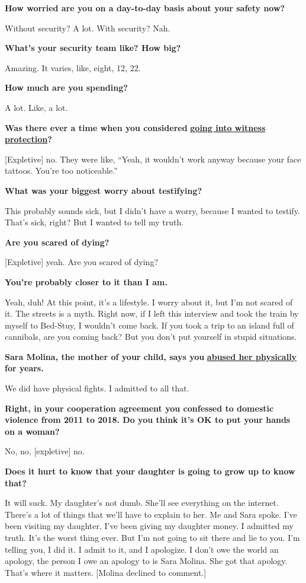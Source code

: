 \textbf{How worried are you on a day-to-day basis about your safety
now?}

Without security? A lot. With security? Nah.

\textbf{What's your security team like? How big?}

Amazing. It varies, like, eight, 12, 22.

\textbf{How much are you spending?}

A lot. Like, a lot.

\textbf{Was there ever a time when you considered}
\textbf{\href{https://www.nytimes3xbfgragh.onion/2019/09/22/nyregion/tekashi-69-trial-testimony.html}{going
into witness protection}?}

{[}Expletive{]} no. They were like, ``Yeah, it wouldn't work anyway
because your face tattoos. You're too noticeable.''

\textbf{What was your biggest worry about testifying?}

This probably sounds sick, but I didn't have a worry, because I wanted
to testify. That's sick, right? But I wanted to tell my truth.

\textbf{Are you scared of dying?}

{[}Expletive{]} yeah. Are you scared of dying?

\textbf{You're probably closer to it than I am.}

Yeah, duh! At this point, it's a lifestyle. I worry about it, but I'm
not scared of it. The streets is a myth. Right now, if I left this
interview and took the train by myself to Bed-Stuy, I wouldn't come
back. If you took a trip to an island full of cannibals, are you coming
back? But you don't put yourself in stupid situations.

\textbf{Sara Molina, the mother of your child, says you}
\textbf{\href{https://www.thedailybeast.com/tekashi69s-ex-girlfriend-sara-molina-i-gave-him-my-heart-he-gave-me-beatings}{abused
her physically}} \textbf{for years.}

We did have physical fights. I admitted to all that.

\textbf{Right, in your cooperation agreement you confessed to domestic
violence from 2011 to 2018. Do you think it's OK to put your hands on a
woman?}

No, no, {[}expletive{]} no.

\textbf{Does it hurt to know that your daughter is going to grow up to
know that?}

It will suck. My daughter's not dumb. She'll see everything on the
internet. There's a lot of things that we'll have to explain to her. Me
and Sara spoke. I've been visiting my daughter, I've been giving my
daughter money. I admitted my truth. It's the worst thing ever. But I'm
not going to sit there and lie to you. I'm telling you, I did it. I
admit to it, and I apologize. I don't owe the world an apology, the
person I owe an apology to is Sara Molina. She got that apology. That's
where it matters. {[}Molina declined to comment.{]}

